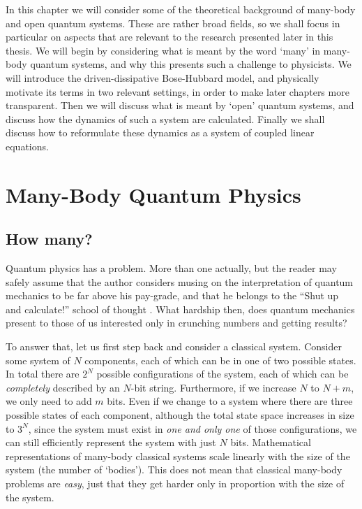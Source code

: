 In this chapter we will consider some of the theoretical background of many-body and open quantum systems. These are rather broad fields, so we shall focus in particular on aspects that are relevant to the research presented later in this thesis. We will begin by considering what is meant by the word `many' in many-body quantum systems, and why this presents such a challenge to physicists. We will introduce the driven-dissipative Bose-Hubbard model, and physically motivate its terms in two relevant settings, in order to make later chapters more transparent. Then we will discuss what is meant by `open' quantum systems, and discuss how the dynamics of such a system are calculated. Finally we shall discuss how to reformulate these dynamics as a system of coupled linear equations.  

\section{Many-Body Quantum Physics}

\subsection{How many?}
Quantum physics has a problem. More than one actually, but the reader may safely assume that the author considers musing on the interpretation of quantum mechanics to be far above his pay-grade, and that he belongs to the ``Shut up and calculate!'' school of thought \cite{Mermin1989}. What hardship then, does quantum mechanics present to those of us interested only in crunching numbers and getting results? 

To answer that, let us first step back and consider a classical system. Consider some system of \(N\) components, each of which can be in one of two possible states. In total there are \(2^{N}\) possible configurations of the system, each of which can be \emph{completely} described by an \(N\)-bit string. Furthermore, if we increase \(N\) to \(N+m\), we only need to add \(m\) bits. Even if we change to a system where there are three possible states of each component, although the total state space increases in size to \(3^{N}\), since the system must exist in \emph{one and only one} of those configurations, we can still efficiently represent the system with just \(N\) bits. Mathematical representations of many-body classical systems scale linearly with the size of the system (the number of `bodies'). This does not mean that classical many-body problems are \emph{easy}, just that they get harder only in proportion with the size of the system.  

